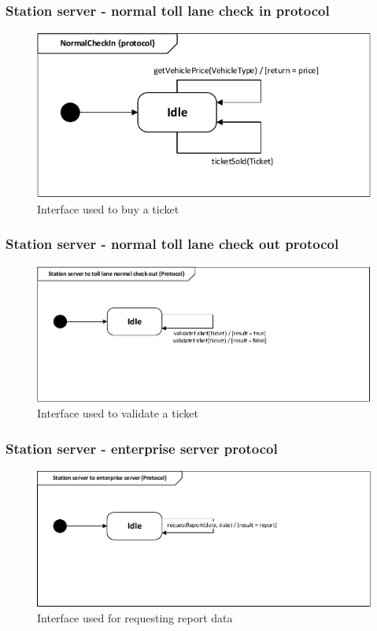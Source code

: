 \subsubsection*{Station server - normal toll lane check in protocol}
\begin{figure}[H]
\centering
\includegraphics[width=0.7\linewidth]{img/behaviour_state_machines/protocol_state_machines/protocol_state_machine_station_server_to_normal_lane_check_in}
\caption{Interface used to buy a ticket}
\label{fig:protocol_state_machine_station_server_to_normal_lane_check_in}
\end{figure}

\subsubsection*{Station server - normal toll lane check out protocol}
\begin{figure}[H]
\centering
\includegraphics[width=0.7\linewidth]{img/behaviour_state_machines/protocol_state_machines/protocol_state_machine_station_server_to_normal_lane_check_out}
\caption{Interface used to validate a ticket}
\label{fig:protocol_state_machine_station_server_to_normal_lane_check_out}
\end{figure}

\subsubsection*{Station server - enterprise server protocol}
\begin{figure}[H]
\centering
\includegraphics[width=0.7\linewidth]{img/behaviour_state_machines/protocol_state_machines/protocol_state_machine_station_server_to_enterprise_server}
\caption{Interface used for requesting report data}
\label{fig:protocol_state_machine_station_server_to_enterprise_server}
\end{figure}

